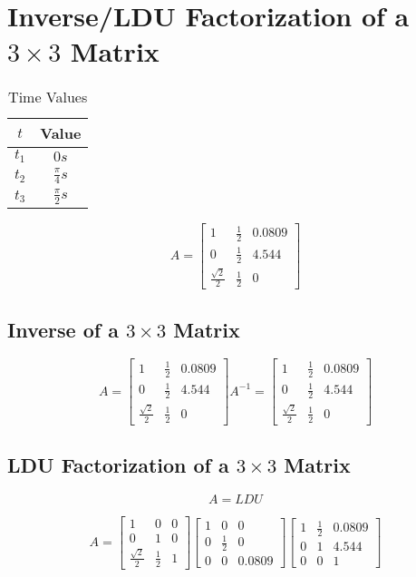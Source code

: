 \section{Inverse/LDU Factorization of a $3\times3$ Matrix}

\begin{table}[h]
    \centering
    \begin{tabular}{|c|c|}
        \hline
        $t$ & Value \\
        \hline
        $t_1$ & $0s$ \\
        $t_2$ & $\frac{\pi}{4}s$ \\
        $t_3$ & $\frac{\pi}{2}s$ \\
        \hline
    \end{tabular}
    \caption{Time Values}
\end{table}

\[
    A = \begin{bmatrix}
        1 & \frac{1}{2} & 0.0809 \\
        0 & \frac{1}{2} & 4.544 \\
        \frac{\sqrt{2}}{2} & \frac{1}{2} & 0
    \end{bmatrix}
\]

\subsection{Inverse of a $3\times3$ Matrix}



\[
    A = \begin{bmatrix}
        1 & \frac{1}{2} & 0.0809 \\
        0 & \frac{1}{2} & 4.544 \\
        \frac{\sqrt{2}}{2} & \frac{1}{2} & 0
    \end{bmatrix}
%
    A^{-1} = \begin{bmatrix}
        1 & \frac{1}{2} & 0.0809 \\
        0 & \frac{1}{2} & 4.544 \\
        \frac{\sqrt{2}}{2} & \frac{1}{2} & 0
    \end{bmatrix}
\]

\subsection{LDU Factorization of a $3\times3$ Matrix}
\[A=LDU\]

\[
    A = 
%
    \begin{bmatrix}
        1 & 0 & 0 \\
        0 & 1 & 0 \\
        \frac{\sqrt{2}}{2} & \frac{1}{2} & 1
    \end{bmatrix}
%
    \begin{bmatrix}
        1 & 0 & 0 \\
        0 & \frac{1}{2} & 0 \\
        0 & 0 & 0.0809
    \end{bmatrix}
%
    \begin{bmatrix}
        1 & \frac{1}{2} & 0.0809 \\
        0 & 1 & 4.544 \\
        0 & 0 & 1
    \end{bmatrix}
\]
